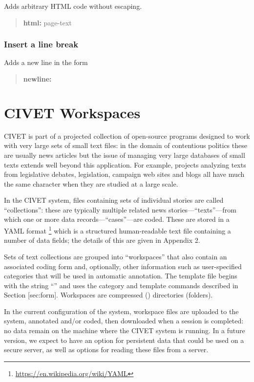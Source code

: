\documentclass[letterpaper,10pt,english]{sphinxmanual}
\begin{document}
Adds arbitrary HTML code without escaping.
\begin{quote}

\begin{DUlineblock}{0em}
\item[] \textbf{html:} page-text
\end{DUlineblock}
\end{quote}


\subsection{Insert a line break}
\label{forms:insert-a-line-break}
Adds a new line in the form
\begin{quote}

\textbf{newline:}
\end{quote}


\chapter{CIVET Workspaces}
\label{workspaces:civet-workspaces}\label{workspaces::doc}
CIVET is part of a projected collection of open-source programs designed
to work with very large sets of small text files: in the domain of
contentious politics these are usually news articles but the issue of
managing very large databases of small texts extends well beyond this
application. For example, projects analyzing texts from legislative
debates, legislation, campaign web sites and blogs all have much the
same character when they are studied at a large scale.

In the CIVET system, files containing sets of individual stories are
called “collections”: these are typically multiple related news
stories—“texts”—from which one or more data records—“cases”—are coded.
These are stored in a YAML format \footnote{
\href{https://en.wikipedia.org/wiki/YAML}{https://en.wikipedia.org/wiki/YAML}
} which is a structured
human-readable text file containing a number of data fields; the details
of this are given in Appendix 2.

Sets of text collections are grouped into “workspaces” that also contain
an associated coding form and, optionally, other information such as
user-specified categories that will be used in automatic annotation. The
template file begins with the string “” and uses the category
and template commands described in Section {[}sec:form{]}. Workspaces are
compressed () directories (folders).

In the current configuration of the system, workspace files are uploaded
to the system, annotated and/or coded, then downloaded when a session is
completed: no data remain on the machine where the CIVET system is
running. In a future version, we expect to have an option for persistent
data that could be used on a secure server, as well as options for
reading these files from a server.
\end{document}
